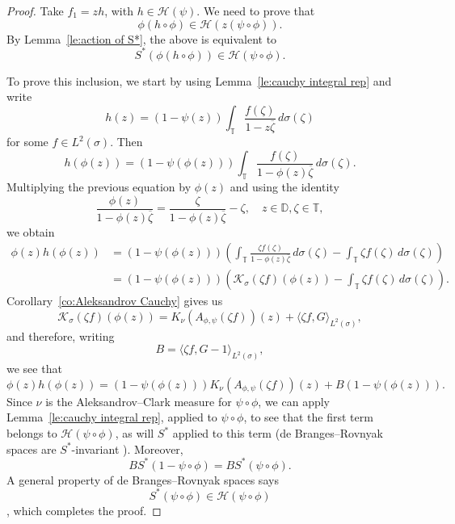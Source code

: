 \documentclass[11pt]{amsart}
\def\<{\langle}
\def\>{\rangle}
\def\D{\mathbb{D}}
\def\T{\mathbb{T}}
\def\HH{{\mathcal H}}
\def\KK{{\mathcal K}}
\numberwithin{equation}{section}
\theoremstyle{plain}
\theoremstyle{definition}
\begin{document}
\begin{proof}	Take $f_1=zh$, with $h\in\HH(\psi )$. We need to prove that $$\phi (h\circ\phi)\in  \HH(z(\psi \circ\phi)).$$ By Lemma~\ref{le:action of S*}, the above is equivalent to
	\begin{equation}\label{eq:to prove2}
		S^*(\phi (h\circ\phi))\in \HH(\psi \circ\phi).
	\end{equation}
	
	To prove this inclusion, we start by using Lemma~\ref{le:cauchy integral rep} and write
	\[
	h(z)=(1-\psi (z))\int_{\T} \frac{f(\zeta)}{1-z\overline{\zeta}}\,d\sigma(\zeta)
	\] 
	for some $f\in L^2(\sigma)$.
	Then
	\[
	h(\phi(z))=(1-\psi  (\phi(z)))\int_{\T} \frac{f(\zeta)}{1-\phi(z)\overline{\zeta}}\,d\sigma(\zeta).
	\]
	Multiplying the previous equation by $\phi(z)$ and using the identity $$\frac{\phi(z)}{1-\phi(z)\overline{\zeta}}=\frac{\zeta}{1-\phi(z)\overline{\zeta}}-\zeta, \quad z \in \D, \zeta \in \T,$$ we obtain
	\[
	\begin{split}
		\phi(z)h(\phi(z))& = (1-\psi  (\phi(z)))\left(\int_{\T} \frac{\zeta f(\zeta)}{1-\phi(z)\overline{\zeta}}\,d\sigma(\zeta)
		- \int_{\T} \zeta f(\zeta)\,d\sigma(\zeta)\right) \\
		&=(1-\psi  (\phi(z)))\left(\KK_\sigma(\zeta f)(\phi(z))-\int_{\T}\zeta f(\zeta) \, d\sigma (\zeta)\right).
	\end{split}
	\]
	Corollary~\ref{co:Aleksandrov Cauchy} gives us 
	\[
	\KK_\sigma(\zeta f)(\phi(z))=K_\nu (A_{\phi, \psi} (\zeta f))(z)+\< \zeta f, G \>_{L^2(\sigma)},
	\]
	and therefore, writing $$B=\< \zeta f, G-1 \>_{L^2(\sigma)},$$ we see that 
	$$
		\phi(z)h(\phi(z))=(1-\psi  (\phi(z)))K_\nu (A_{\phi, \psi}(\zeta f))(z)+B(1-\psi  (\phi(z))).
	$$
	Since $\nu$ is the Aleksandrov--Clark measure for $\psi \circ \phi$, we can apply Lemma~\ref{le:cauchy integral rep}, applied to $\psi  \circ\phi$, to see that the first term belongs to  $\HH(\psi  \circ\phi)$, as will $S^{*}$ applied to this term (de Branges--Rovnyak spaces are $S^{*}$-invariant \cite[Thm.~18.13]{Hb2-book}). Moreover, 
	\[
	BS^*(1-\psi  \circ\phi)=BS^*(\psi  \circ\phi).
	\]
A general property of de Branges--Rovnyak spaces says $$ S^*(\psi  \circ\phi)\in \HH(\psi\circ\phi) $$ \cite[Thm.~18.18]{Hb2-book}, which completes the proof. 	
	\end{proof}
\end{document}
